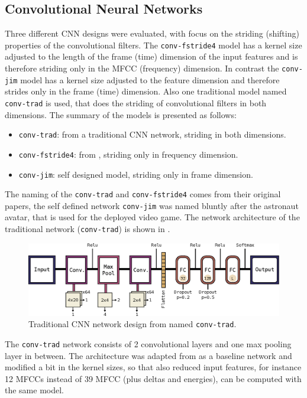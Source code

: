 \subsection{Convolutional Neural Networks}\label{sec:nn_arch_cnn}
Three different CNN designs were evaluated, with focus on the striding (shifting) properties of the convolutional filters.
The \texttt{conv-fstride4} model has a kernel size adjusted to the length of the frame (time) dimension of the input features and is therefore striding only in the MFCC (frequency) dimension.
In contrast the \texttt{conv-jim} model has a kernel size adjusted to the feature dimension and therefore strides only in the frame (time) dimension.
Also one traditional model named \texttt{conv-trad} is used, that does the striding of convolutional filters in both dimensions.
The summary of the models is presented as follows:
\begin{itemize}
	\item \texttt{conv-trad}: from \cite{Sainath2015} a traditional CNN network, striding in both dimensions.
	\item \texttt{conv-fstride4}: from \cite{Sainath2015}, striding only in frequency dimension.
	\item \texttt{conv-jim}: self designed model, striding only in frame dimension.
\end{itemize}
The naming of the \texttt{conv-trad} and \texttt{conv-fstride4} comes from their original papers, the self defined network \texttt{conv-jim} was named bluntly after the astronaut avatar, that is used for the deployed video game.
The network architecture of the traditional network (\texttt{conv-trad}) is shown in .
\begin{figure}[!ht]
  \centering
    \includegraphics[height=0.2\textwidth]{./4_nn/figs/nn_arch_cnn_trad.eps}
  \caption{Traditional CNN network design from \cite{Sainath2015} named \texttt{conv-trad}.}
  \label{fig:nn_arch_cnn_trad}
\end{figure}
\FloatBarrier
\noindent
The \texttt{conv-trad} network consists of 2 convolutional layers and one max pooling layer in between.
The architecture was adapted from \cite{Sainath2015} as a baseline network and modified a bit in the kernel sizes, so that also reduced input features, for instance 12 MFCCs instead of 39 MFCC (plus deltas and energies), can be computed with the same model.
